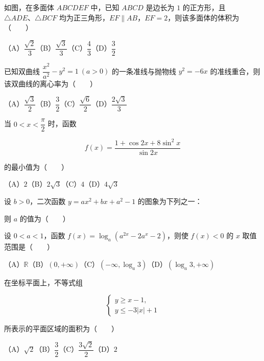 \begin{question}
如图，在多面体 $ABCDEF$ 中，已知 $ABCD$ 是边长为 $1$ 的正方形，且 $\triangle ADE\text{、}\triangle BCF$ 均为正三角形，$EF\parallel AB$，$EF=2$，则该多面体的体积为\mbox{（　　）}
\nopagebreak[4]
\begin{center}\end{center}
\nopagebreak[4]
（A）$\dfrac{\sqrt2}{3}$\quad（B）$\dfrac{\sqrt3}{3}$\quad（C）$\dfrac43$\quad（D）$\dfrac32$

\end{question}
\begin{question}
已知双曲线 $\dfrac{x^2}{a^2}-y^2=1\ (a>0)$ 的一条准线与抛物线 $y^2=-6x$ 的准线重合，则该双曲线的离心率为\mbox{（　　）}

（A）$\dfrac{\sqrt3}{2}$\quad（B）$\dfrac32$\quad（C）$\dfrac{\sqrt6}{2}$\quad（D）$\dfrac{2\sqrt3}{3}$

\end{question}
\begin{question}
当 $0<x<\dfrac{\pi}{2}$ 时，函数

\nopagebreak[4]
\[
f(x)=\frac{1+\cos2x+8\sin^2x}{\sin2x}
\]

的最小值为\mbox{（　　）}

（A）$2$\quad（B）$2\sqrt3$\quad（C）$4$\quad（D）$4\sqrt3$

\Needspace{0.4\textheight}
\end{question}
\begin{question}
设 $b>0$，二次函数 $y=ax^2+bx+a^2-1$ 的图象为下列之一：
\nopagebreak[4]
\begin{center}\end{center}
\nopagebreak[4]
则 $a$ 的值为\mbox{（　　）}

\end{question}
\begin{question}
设 $0<a<1$，函数 $f(x)=\log_a(a^{2x}-2a^x-2)$，则使 $f(x)<0$ 的 $x$ 取值范围是\mbox{（　　）}

（A）$\mathbb R$\quad（B）$(0,+\infty)$\quad（C）$(-\infty,\log_a3)$\quad（D）$(\log_a3,+\infty)$

\end{question}
\begin{question}
在坐标平面上，不等式组

\nopagebreak[4]
\[
\begin{cases}
y\geqslant x-1,\\
y\leqslant-3|x|+1
\end{cases}
\]

所表示的平面区域的面积为\mbox{（　　）}

（A）$\sqrt2$\quad（B）$\dfrac32$\quad（C）$\dfrac{3\sqrt2}{2}$\quad（D）$2$

\end{question}
